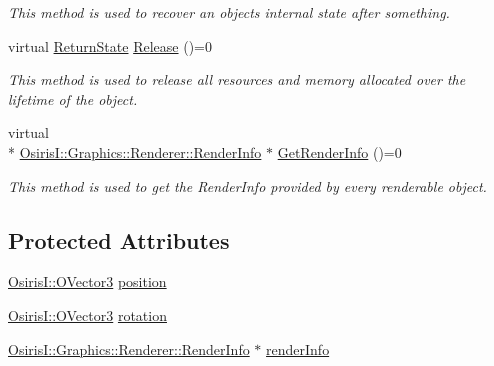 \begin{DoxyCompactItemize}
\begin{DoxyCompactList}\small\item\em This method is used to recover an objects internal state after something. \end{DoxyCompactList}\item 
virtual \hyperlink{namespace_osiris_i_a8f53bf938dc75c65c6a529694514013e}{Return\-State} \hyperlink{class_osiris_i_1_1_graphics_1_1_components_1_1_i_component_a558778a2ac92fcc1e85c63d20bab5811}{Release} ()=0
\begin{DoxyCompactList}\small\item\em This method is used to release all resources and memory allocated over the lifetime of the object. \end{DoxyCompactList}\item 
virtual \\*
\hyperlink{struct_osiris_i_1_1_graphics_1_1_renderer_1_1_render_info}{Osiris\-I\-::\-Graphics\-::\-Renderer\-::\-Render\-Info} $\ast$ \hyperlink{class_osiris_i_1_1_graphics_1_1_components_1_1_i_component_a183f0f71d025102480df6ea2bd53f403}{Get\-Render\-Info} ()=0
\begin{DoxyCompactList}\small\item\em This method is used to get the Render\-Info provided by every renderable object. \end{DoxyCompactList}\end{DoxyCompactItemize}
\subsection*{Protected Attributes}
\begin{DoxyCompactItemize}
\item 
\hyperlink{struct_osiris_i_1_1_o_vector3}{Osiris\-I\-::\-O\-Vector3} \hyperlink{class_osiris_i_1_1_graphics_1_1_components_1_1_i_component_a2230b1776977acacc269c7adb4beb3bf}{position}
\item 
\hyperlink{struct_osiris_i_1_1_o_vector3}{Osiris\-I\-::\-O\-Vector3} \hyperlink{class_osiris_i_1_1_graphics_1_1_components_1_1_i_component_a0eac7cc547b49676636ef5986539ae4f}{rotation}
\item 
\hyperlink{struct_osiris_i_1_1_graphics_1_1_renderer_1_1_render_info}{Osiris\-I\-::\-Graphics\-::\-Renderer\-::\-Render\-Info} $\ast$ \hyperlink{class_osiris_i_1_1_graphics_1_1_components_1_1_i_component_a0306ee950e9f04b43f09c23821ca35f8}{render\-Info}
\end{DoxyCompactItemize}


